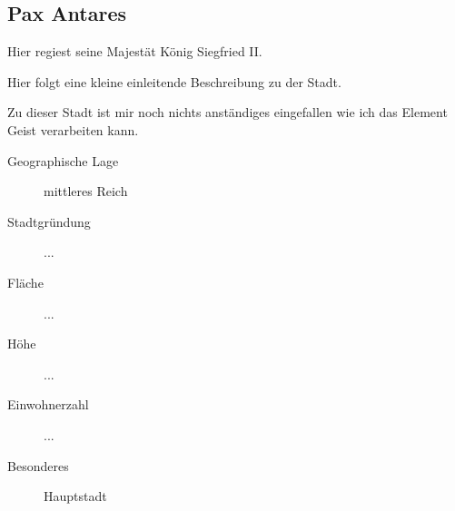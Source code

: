 \subsection{Pax Antares}
\par Hier regiest seine Majestät König Siegfried II.
\par Hier folgt eine kleine einleitende Beschreibung zu der Stadt.
\par Zu dieser Stadt ist mir noch nichts anständiges eingefallen wie ich das Element Geist verarbeiten kann.

\begin{description}
\item [Geographische Lage] mittleres Reich
\item [Stadtgründung] ...
\item [Fläche] ...
\item [Höhe] ...
\item [Einwohnerzahl] ...
\item [Besonderes] Hauptstadt
\end{description}